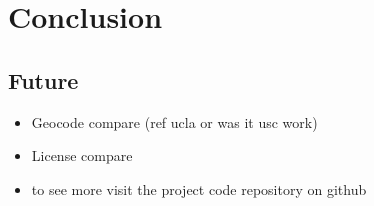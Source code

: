 \documentclass[12pt,letterpaper]{article}
\begin{document}


\section{Conclusion}
\subsection{Future}
\begin{itemize}
	\item Geocode compare (ref ucla or was it usc work)
	\item License compare
	\item to see more visit the project code repository on github
\end{itemize}

\printbibliography[heading=bibliography]
\end{document}
